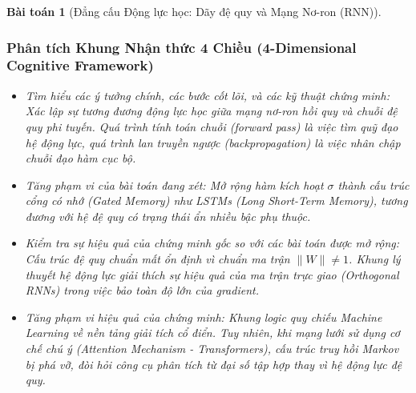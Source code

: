 \documentclass{article}
\newtheorem{baitoan}{Bài toán}
\begin{document}
\begin{baitoan}[Đẳng cấu Động lực học: Dãy đệ quy và Mạng Nơ-ron (RNN)]
 \subsubsection*{Phân tích Khung Nhận thức 4 Chiều (4-Dimensional Cognitive Framework)}
 \begin{itemize}
 \item \textit{Tìm hiểu các ý tưởng chính, các bước cốt lõi, và các kỹ thuật chứng minh}: Xác lập sự tương đương động lực học giữa mạng nơ-ron hồi quy và chuỗi đệ quy phi tuyến. Quá trình tính toán chuỗi (forward pass) là việc tìm quỹ đạo hệ động lực, quá trình lan truyền ngược (backpropagation) là việc nhân chập chuỗi đạo hàm cục bộ.
 \item \textit{Tăng phạm vi của bài toán đang xét}: Mở rộng hàm kích hoạt $\sigma$ thành cấu trúc cổng có nhớ (Gated Memory) như LSTMs (Long Short-Term Memory), tương đương với hệ đệ quy có trạng thái ẩn nhiều bậc phụ thuộc.
 \item \textit{Kiểm tra sự hiệu quả của chứng minh gốc so với các bài toán được mở rộng}: Cấu trúc đệ quy chuẩn mất ổn định vì chuẩn ma trận $\|W\| \neq 1$. Khung lý thuyết hệ động lực giải thích sự hiệu quả của ma trận trực giao (Orthogonal RNNs) trong việc bảo toàn độ lớn của gradient.
 \item \textit{Tăng phạm vi hiệu quả của chứng minh}: Khung logic quy chiếu Machine Learning về nền tảng giải tích cổ điển. Tuy nhiên, khi mạng lưới sử dụng cơ chế chú ý (Attention Mechanism - Transformers), cấu trúc truy hồi Markov bị phá vỡ, đòi hỏi công cụ phân tích từ đại số tập hợp thay vì hệ động lực đệ quy.
 \end{itemize}
\end{baitoan}

\end{document}
